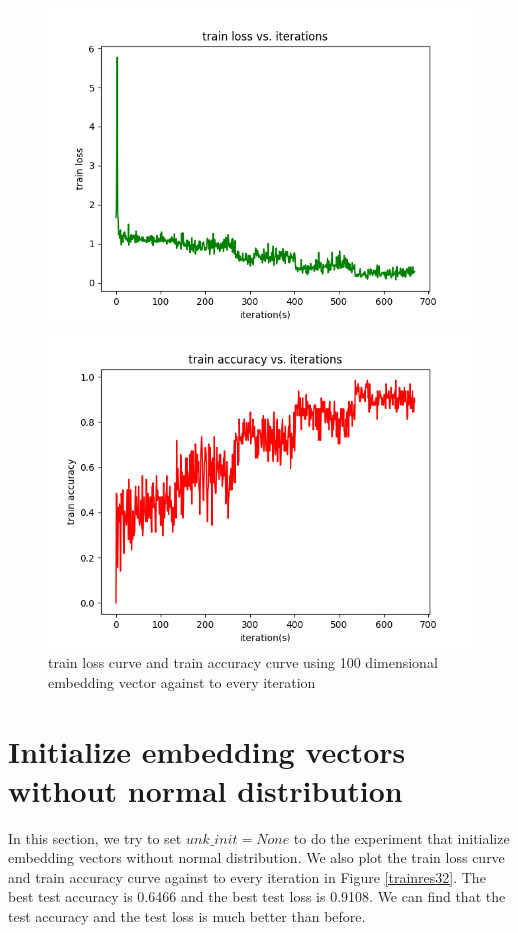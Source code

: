 \documentclass{elegantbook}
\begin{document}
\begin{figure}[!h]
	\centering
	\begin{minipage}[t]{0.48\textwidth}
		\centering
		\includegraphics[width=\textwidth]{../codes/trainlossgrucell2}
	\end{minipage}
	\begin{minipage}[t]{0.48\textwidth}
		\centering
		\includegraphics[width=\textwidth]{../codes/trainaccgrucell2}
	\end{minipage}
	\caption{\label{trainres22}train loss curve and train accuracy curve using 100 dimensional embedding vector against to every iteration}
\end{figure}

\section{Initialize embedding vectors without normal distribution}
In this section, we try to set $unk\_init=None$ to do the experiment that initialize embedding vectors without normal distribution. We also plot the train loss curve and train accuracy curve against to every iteration in Figure \ref{trainres32}. The best test accuracy is 0.6466 and the best test loss is 0.9108. We can find that the test accuracy and the test loss is much better than before.
\end{document}
